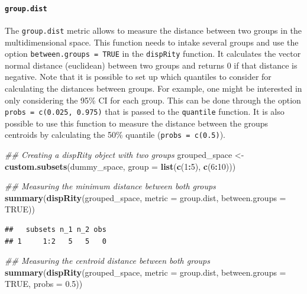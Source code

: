 \documentclass[
]{book}
\newenvironment{Shaded}{\begin{snugshade}}{\end{snugshade}}
\newcommand{\CommentTok}[1]{\textcolor[rgb]{0.56,0.35,0.01}{\textit{#1}}}
\newcommand{\DataTypeTok}[1]{\textcolor[rgb]{0.13,0.29,0.53}{#1}}
\newcommand{\DecValTok}[1]{\textcolor[rgb]{0.00,0.00,0.81}{#1}}
\newcommand{\FloatTok}[1]{\textcolor[rgb]{0.00,0.00,0.81}{#1}}
\newcommand{\KeywordTok}[1]{\textcolor[rgb]{0.13,0.29,0.53}{\textbf{#1}}}
\newcommand{\NormalTok}[1]{#1}
\newcommand{\OperatorTok}[1]{\textcolor[rgb]{0.81,0.36,0.00}{\textbf{#1}}}
\newcommand{\OtherTok}[1]{\textcolor[rgb]{0.56,0.35,0.01}{#1}}
\newcommand{\StringTok}[1]{\textcolor[rgb]{0.31,0.60,0.02}{#1}}
\begin{document}
\hypertarget{group.dist}{%
\paragraph{\texorpdfstring{\texttt{group.dist}}{group.dist}}\label{group.dist}}

The \texttt{group.dist} metric allows to measure the distance between two groups in the multidimensional space.
This function needs to intake several groups and use the option \texttt{between.groups\ =\ TRUE} in the \texttt{dispRity} function.
It calculates the vector normal distance (euclidean) between two groups and returns 0 if that distance is negative.
Note that it is possible to set up which quantiles to consider for calculating the distances between groups.
For example, one might be interested in only considering the 95\% CI for each group.
This can be done through the option \texttt{probs\ =\ c(0.025,\ 0.975)} that is passed to the \texttt{quantile} function.
It is also possible to use this function to measure the distance between the groups centroids by calculating the 50\% quantile (\texttt{probs\ =\ c(0.5)}).

\begin{Shaded}
\begin{Highlighting}[]
\CommentTok{\#\# Creating a dispRity object with two groups}
\NormalTok{grouped\_space \textless{}{-}}\StringTok{ }\KeywordTok{custom.subsets}\NormalTok{(dummy\_space,}
                      \DataTypeTok{group =} \KeywordTok{list}\NormalTok{(}\KeywordTok{c}\NormalTok{(}\DecValTok{1}\OperatorTok{:}\DecValTok{5}\NormalTok{), }\KeywordTok{c}\NormalTok{(}\DecValTok{6}\OperatorTok{:}\DecValTok{10}\NormalTok{)))}

\CommentTok{\#\# Measuring the minimum distance between both groups}
\KeywordTok{summary}\NormalTok{(}\KeywordTok{dispRity}\NormalTok{(grouped\_space, }\DataTypeTok{metric =}\NormalTok{ group.dist,}
                 \DataTypeTok{between.groups =} \OtherTok{TRUE}\NormalTok{))}
\end{Highlighting}
\end{Shaded}

\begin{verbatim}
##   subsets n_1 n_2 obs
## 1     1:2   5   5   0
\end{verbatim}

\begin{Shaded}
\begin{Highlighting}[]
\CommentTok{\#\# Measuring the centroid distance between both groups}
\KeywordTok{summary}\NormalTok{(}\KeywordTok{dispRity}\NormalTok{(grouped\_space, }\DataTypeTok{metric =}\NormalTok{ group.dist,}
                 \DataTypeTok{between.groups =} \OtherTok{TRUE}\NormalTok{, }\DataTypeTok{probs =} \FloatTok{0.5}\NormalTok{))}
\end{Highlighting}
\end{Shaded}
\end{document}
